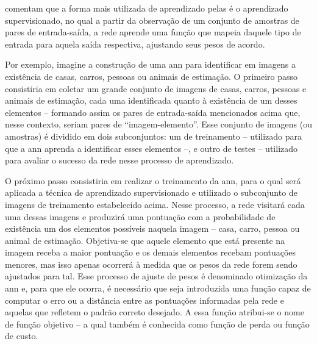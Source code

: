 

 comentam que a forma mais utilizada de aprendizado pelas  é o aprendizado supervisionado, no qual a partir da observação de um conjunto de amostras de pares de entrada-saída, a rede aprende uma função que mapeia daquele tipo de entrada para aquela saída respectiva, ajustando seus pesos de acordo.

Por exemplo, imagine a construção de uma \acrshort{ann} para identificar em imagens a existência de casas, carros, pessoas ou animais de estimação. O primeiro passo consistiria em coletar um grande conjunto de imagens de casas, carros, pessoas e animais de estimação, cada uma identificada quanto à existência de um desses elementos -- formando assim os pares de entrada-saída mencionados acima que, nesse contexto, seriam pares de ``imagem-elemento''.
Esse conjunto de imagens (ou amostras) é dividido em dois subconjuntos: um de treinamento -- utilizado para que a \acrshort{ann} aprenda a identificar esses elementos --, e outro de testes -- utilizado para avaliar o sucesso da rede nesse processo de aprendizado.

O próximo passo consistiria em realizar o treinamento da \acrshort{ann}, para o qual será aplicada a técnica de aprendizado supervisionado e utilizado o subconjunto de imagens de treinamento estabelecido acima.
Nesse processo, a rede visitará cada uma dessas imagens e produzirá uma pontuação com a probabilidade de existência um dos elementos possíveis naquela imagem -- casa, carro, pessoa ou animal de estimação.
Objetiva-se que aquele elemento que está presente na imagem receba a maior pontuação e os demais elementos recebam pontuações menores, mas isso apenas ocorrerá à medida que os pesos da rede forem sendo ajustados para tal.
Esse processo de ajuste de pesos é denominado otimização da \acrshort{ann} e, para que ele ocorra, é necessário que seja introduzida uma função capaz de computar o erro ou a distância entre as pontuações informadas pela rede e aquelas que refletem o padrão correto desejado.
A essa função atribui-se o nome de função objetivo -- a qual também é conhecida como função de perda ou função de custo.


